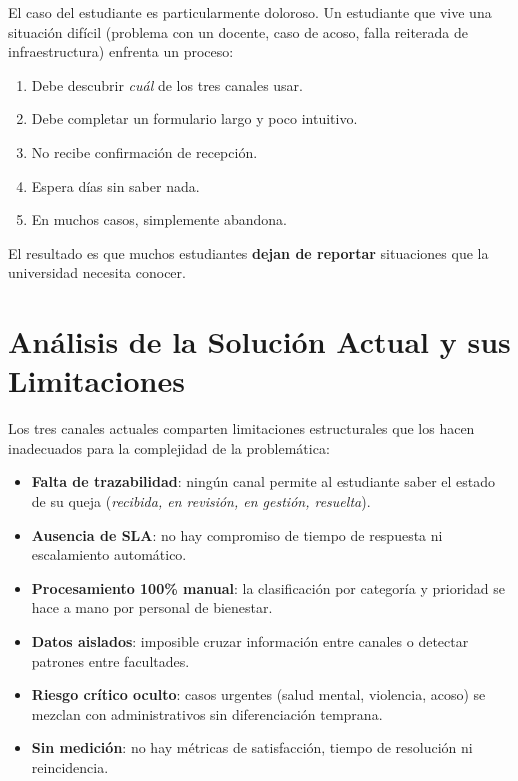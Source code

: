 \documentclass[11pt,a4paper]{article}
\begin{document}
El caso del estudiante es particularmente doloroso. Un estudiante que vive una situaci\'on dif\'icil (problema con un docente, caso de acoso, falla reiterada de infraestructura) enfrenta un proceso:

\begin{enumerate}[leftmargin=*]
    \item Debe descubrir \textit{cu\'al} de los tres canales usar.
    \item Debe completar un formulario largo y poco intuitivo.
    \item No recibe confirmaci\'on de recepci\'on.
    \item Espera d\'ias sin saber nada.
    \item En muchos casos, simplemente abandona.
\end{enumerate}

El resultado es que muchos estudiantes \textbf{dejan de reportar} situaciones que la universidad necesita conocer.

\section{An\'alisis de la Soluci\'on Actual y sus Limitaciones}

Los tres canales actuales comparten limitaciones estructurales que los hacen inadecuados para la complejidad de la problem\'atica:

\begin{itemize}[leftmargin=*]
    \item \textbf{Falta de trazabilidad}: ning\'un canal permite al estudiante saber el estado de su queja (\textit{recibida, en revisi\'on, en gesti\'on, resuelta}).
    \item \textbf{Ausencia de SLA}: no hay compromiso de tiempo de respuesta ni escalamiento autom\'atico.
    \item \textbf{Procesamiento 100\% manual}: la clasificaci\'on por categor\'ia y prioridad se hace a mano por personal de bienestar.
    \item \textbf{Datos aislados}: imposible cruzar informaci\'on entre canales o detectar patrones entre facultades.
    \item \textbf{Riesgo cr\'itico oculto}: casos urgentes (salud mental, violencia, acoso) se mezclan con administrativos sin diferenciaci\'on temprana.
    \item \textbf{Sin medici\'on}: no hay m\'etricas de satisfacci\'on, tiempo de resoluci\'on ni reincidencia.
\end{itemize}
\end{document}
